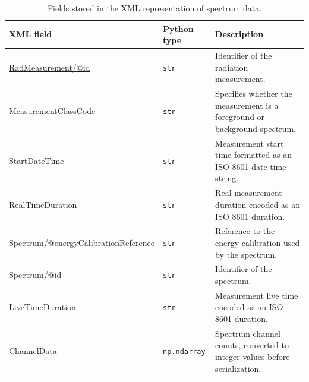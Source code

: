\begin{table}[H]
    \centering
    \caption{Fields stored in the XML representation of spectrum data.}
    \label{tab:spectrum-data-xml-fields}
    \begin{tabular}{p{} p{} p{}}
    \toprule
    \textbf{XML field} & \textbf{Python type} & \textbf{Description} \\ \midrule

    \url{RadMeasurement/@id}
        & \texttt{str}
        & Identifier of the radiation measurement. \\

    \url{MeasurementClassCode}
        & \texttt{str}
        & Specifies whether the measurement is a foreground or background spectrum. \\

    \url{StartDateTime}
        & \texttt{str}
        & Measurement start time formatted as an ISO 8601 date-time string. \\

    \url{RealTimeDuration}
        & \texttt{str}
        & Real measurement duration encoded as an ISO 8601 duration. \\

    \url{Spectrum/@energyCalibrationReference}
        & \texttt{str}
        & Reference to the energy calibration used by the spectrum. \\

    \url{Spectrum/@id}
        & \texttt{str}
        & Identifier of the spectrum. \\

    \url{LiveTimeDuration}
        & \texttt{str}
        & Measurement live time encoded as an ISO 8601 duration. \\

    \url{ChannelData}
        & \texttt{np.ndarray}
        & Spectrum channel counts, converted to integer values before serialization. \\

    \bottomrule
    \end{tabular}
\end{table}


